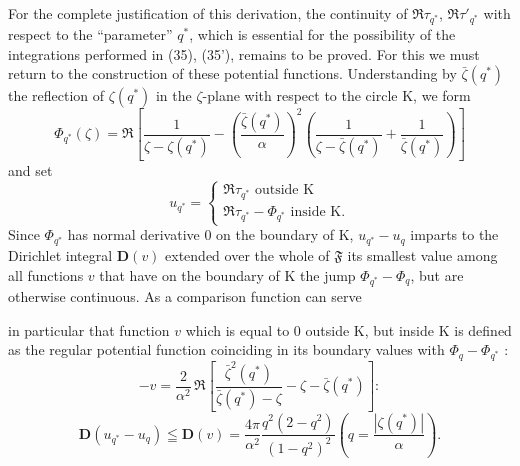 \documentclass{article}
\begin{document}
For the complete justification of this derivation, the continuity of $\Re\tau_{q^*}$, $\Re\tau'_{q^*}$ with respect to the ``parameter'' $q^*$, which is essential for the possibility of the integrations performed in (35), (35'), remains to be proved. For this we must return to the construction of these potential functions. Understanding by $\bar{\zeta}(q^*)$ the reflection of $\zeta(q^*)$ in the $\zeta$-plane with respect to the circle $\mathrm{K}$, we form
\[ \Phi_{q^*}(\zeta) = \Re \left[ \frac{1}{\zeta - \zeta(q^*)} - \left( \frac{\bar{\zeta}(q^*)}{\alpha} \right)^2 \left( \frac{1}{\zeta - \bar{\zeta}(q^*)} + \frac{1}{\bar{\zeta}(q^*)} \right) \right] \]
and set
\[ u_{q^*} = \begin{cases}
\Re\tau_{q^*} \text{ outside } \mathrm{K} \\
\Re\tau_{q^*} - \Phi_{q^*} \text{ inside } \mathrm{K}.
\end{cases} \]
Since $\Phi_{q^*}$ has normal derivative $0$ on the boundary of $\mathrm{K}$, $u_{q^*} - u_q$ imparts to the Dirichlet integral $\mathbf{D}(v)$ extended over the whole of $\mathfrak{F}$ its smallest value among all functions $v$ that have on the boundary of $\mathrm{K}$ the jump $\Phi_{q^*} - \Phi_q$, but are otherwise continuous. As a comparison function can serve

in particular that function $v$ which is equal to $0$ outside $\mathrm{K}$, but inside $\mathrm{K}$ is defined as the regular potential function coinciding in its boundary values with $\Phi_q - \Phi_{q^*}$ :
\[ -v = \frac{2}{\alpha^2} \, \Re \left[ \frac{\bar{\zeta}^2(q^*)}{\bar{\zeta}(q^*) - \zeta} - \zeta - \bar{\zeta}(q^*) \right]\colon \]
\[ \mathbf{D}(u_{q^*} - u_q) \leqq \mathbf{D}(v) = \frac{4\pi}{\alpha^2} \frac{q^2(2 - q^2)}{(1 - q^2)^2} \left( q = \frac{|\zeta(q^*)|}{\alpha} \right). \tag{36} \]
\end{document}

